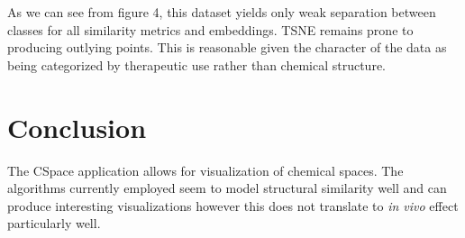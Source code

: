 \documentclass[12pt]{article}
\begin{document}
As we can see from figure 4, this dataset yields only weak separation between classes for all similarity metrics and embeddings. TSNE remains prone to producing outlying points. This is reasonable given the character of the data as being categorized by therapeutic use rather than chemical structure.

\section{Conclusion}
The CSpace application allows for visualization of chemical spaces. The algorithms currently employed seem to model structural similarity well and can produce interesting visualizations however this does not translate to \textit{in vivo} effect particularly well.

\newpage


\end{document}
